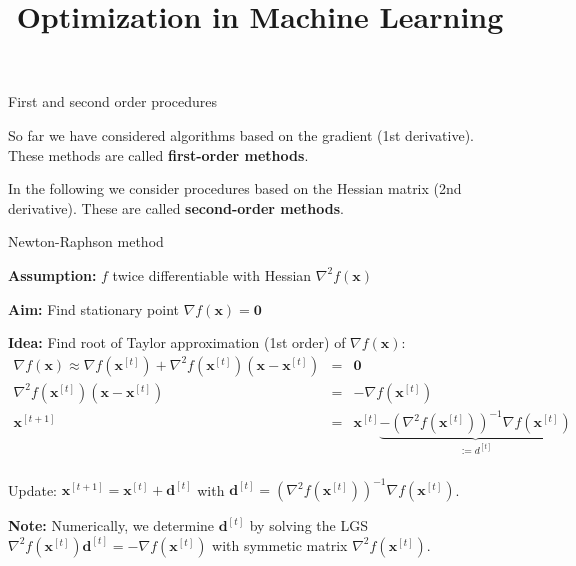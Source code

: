 \documentclass[11pt,compress,t,notes=noshow, xcolor=table]{beamer}
\title{Optimization in Machine Learning}
\date{}
\begin{document}
\sloppy

\begin{vbframe}{First and second order procedures}

So far we have considered algorithms based on the gradient (1st derivative). These methods are called \textbf{first-order methods}.

\lz

In the following we consider procedures based on the Hessian matrix (2nd derivative). These are called \textbf{second-order methods}.

\end{vbframe}

\begin{vbframe}{Newton-Raphson method}

\textbf{Assumption:} $f$ twice differentiable with Hessian $\nabla^2 f(\bm{x})$

\lz

\textbf{Aim:} Find stationary point $\nabla f(\bm{x}) = \bm{0}$
\lz 

\textbf{Idea:} Find root of Taylor approximation (1st order) of $\nabla f(\bm{x})$:
\begin{eqnarray*}
\nabla f(\mathbf{x}) \approx \nabla f(\mathbf{x}^{[t]}) +
\nabla^2 f(\mathbf{x}^{[t]})(\mathbf{x} - \mathbf{x}^{[t]}) &=& \mathbf{0} \\
\nabla^2 f(\mathbf{x}^{[t]})(\mathbf{x} - \mathbf{x}^{[t]}) &=& - \nabla f(\mathbf{x}^{[t]}) \\
\mathbf{x}^{[t+1]} &=& \mathbf{x}^{[t]} \underbrace{- \left(\nabla^2 f(\mathbf{x}^{[t]})\right)^{-1}\nabla f(\mathbf{x}^{[t]})}_{:= d^{[t]}} \\
\end{eqnarray*}

\vspace*{-0.2cm}

Update: $\bm{x}^{[t+1]} = \bm{x}^{[t]} + \bm{d}^{[t]}$ with $\bm{d}^{[t]} =  \left(\nabla^2 f(\mathbf{ x}^{[t]})\right)^{-1}\nabla f(\mathbf{x}^{[t]})$.

\vspace*{0.3cm}

\textbf{Note: } Numerically, we determine $\bm{d}^{[t]}$ by solving the LGS $\nabla^2 f(\mathbf{x}^{[t]})\bm{d}^{[t]} = - \nabla f(\mathbf{x}^{[t]})$ with symmetic matrix $\nabla^2 f(\mathbf{x}^{[t]})$. 



\end{vbframe}
\end{document}
